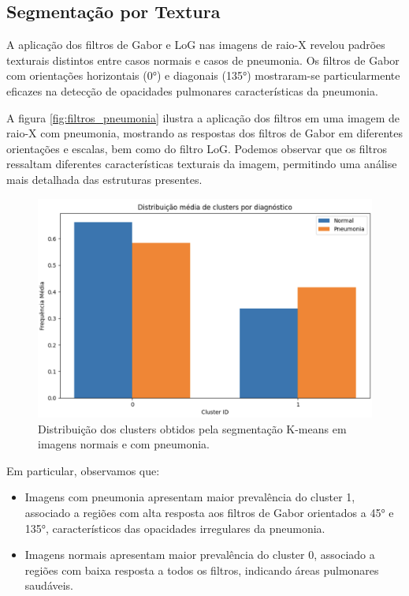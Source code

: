 \documentclass[sigconf,nonacm]{acmart}
\begin{document}
\subsection{Segmentação por Textura}
A aplicação dos filtros de Gabor e LoG nas imagens de raio-X revelou padrões texturais distintos entre casos normais e casos de pneumonia. Os filtros de Gabor com orientações horizontais (0°) e diagonais (135°) mostraram-se particularmente eficazes na detecção de opacidades pulmonares características da pneumonia.

A figura \ref{fig:filtros_pneumonia} ilustra a aplicação dos filtros em uma imagem de raio-X com pneumonia, mostrando as respostas dos filtros de Gabor em diferentes orientações e escalas, bem como do filtro LoG. Podemos observar que os filtros ressaltam diferentes características texturais da imagem, permitindo uma análise mais detalhada das estruturas presentes.

\begin{figure}[h]
  \centering
  \includegraphics[width=0.8\linewidth]{../images/cluster_distribution.png}
  \caption{Distribuição dos clusters obtidos pela segmentação K-means em imagens normais e com pneumonia.}
  \label{fig:clusters}
\end{figure}
  
Em particular, observamos que:

\begin{itemize}
  \item Imagens com pneumonia apresentam maior prevalência do cluster 1, associado a regiões com alta resposta aos filtros de Gabor orientados a 45° e 135°, característicos das opacidades irregulares da pneumonia.
  \item Imagens normais apresentam maior prevalência do cluster 0, associado a regiões com baixa resposta a todos os filtros, indicando áreas pulmonares saudáveis.
\end{itemize}
\end{document}
